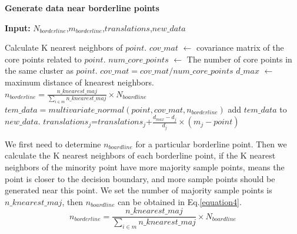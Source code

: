 \documentclass[ida]{iosart2x}
\begin{document}
\textbf{Generate data near borderline points}
\begin{algorithm}[tb]
  \caption{$generate\_borderline$}
  \label{alg3}
  \hspace*{0.02in} {\bf Input:} %
   $N_{borderline}$,$m_{borderline}$,$translations$,$new\_data$
  \begin{algorithmic}
      \State Calculate K nearest neighbors of $point$.
      \State $cov\_mat$ $\leftarrow$ covariance matrix of the core points related to $point$.
      \State $num\_core\_points$ $\leftarrow$ The number of core points in the same cluster as $point$.
      \State $cov\_mat=cov\_mat/num\_core\_points$
      \State $d\_max$ $\leftarrow$ maximum distance of knearest neighbors.
  　　 \State $n_{borderline}=\frac{n\_knearest\_maj}{\sum_{i\in m} n\_knearest\_maj}\times N_{boardline}$
      \State $tem\_data=multivariate\_normal(point,cov\_mat,n_{borderline})$
      \State add $tem\_data$ to $new\_data$.
        \State $translations_j$=$translations_j$+$\frac{d_{max}-d_{j}}{d_{j}}\times (m_{j}-point)$
      \EndFor
  \EndFor
  \end{algorithmic}
\end{algorithm}
We first need to determine $n_{boardline}$ for a particular borderline point.
Then we calculate the K nearest neighbors of each borderline point, 
if the K nearest neighbors of the minority point have more majority sample points, 
means the point 
is closer to the decision boundary, and more sample points should be generated near this point.
We set the number of majority sample points is $n\_knearest\_maj$,
then $n_{boardline}$ can be obtained in Eq.\ref{equation4}.
\begin{equation}
  \label{equation4}
  n_{borderline}=\frac{n\_knearest\_maj}{\sum_{i\in m} n\_knearest\_maj}\times N_{boardline}
\end{equation}
\end{document}
